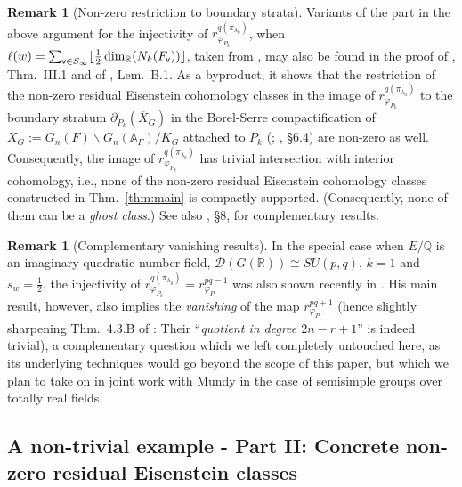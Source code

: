 \documentclass[a4paper,10pt]{amsart}
\theoremstyle{definition}
\newtheorem{rem}[equation]{Remark}
\numberwithin{equation}{section}
\def\R{\mathbb R}
\def\A{\mathbb A}
\def\Q{\mathbb Q}
\def\vv{{\sf v}} %
\begin{document}
\begin{rem}[Non-zero restriction to boundary strata]
Variants of the part in the above argument for the injectivity of $r^{q(\pi_{\lambda_0})}_{\varphi_{P_k}}$, when $\ell(w)=\sum_{\vv\in S_\infty}\lfloor\tfrac12 \dim_{\R}(N_{k}(F_\vv))\rfloor $, taken from \cite{grob22}, may also be found in the proof of \cite{rosp}, Thm.\ III.1 and of \cite{nairrai}, Lem.\ B.1. As a byproduct, it shows that the restriction of the non-zero residual Eisenstein cohomology classes in the image of $r^{q(\pi_{\lambda_0})}_{\varphi_{P_k}}$ to the boundary stratum $\partial_{P_k}(\overline X_G)$ in the Borel-Serre compactification of $X_G:=G_n(F)\backslash G_n(\A_F)/K_G$ attached to $P_k$ (\cite{boserre}; \cite{rohlfs}, \S 6.4) are non-zero as well. Consequently, the image of $r^{q(\pi_{\lambda_0})}_{\varphi_{P_k}}$ has trivial intersection with interior cohomology, i.e., none of the non-zero residual Eisenstein cohomology classes constructed in Thm.\ \ref{thm:main} is compactly supported. (Consequently, none of them can be a {\it ghost class}.) See also \cite{grobner-EisRes}, \S8, for complementary results.
\end{rem}

\begin{rem}[Complementary vanishing results]
In the special case when $E/\Q$ is an imaginary quadratic number field, $\mathcal D(G(\R))\cong SU(p,q)$, $k=1$ and $s_w=\tfrac12$, the injectivity of $r^{q(\pi_{\lambda_0})}_{\varphi_{P_k}}=r^{pq-1}_{\varphi_{P_1}}$ was also shown recently in \cite{mundy}. His main result, however, also implies the {\it vanishing} of the map $r^{pq+1}_{\varphi_{P_1}}$ (hence slightly sharpening Thm.\ 4.3.B of \cite{grabschwun}: Their ``{\it quotient in degree $2n-r+1$}'' is indeed trivial), a complementary question which we left completely untouched here, as its underlying techniques would go beyond the scope of this paper, but which we plan to take on in joint work with Mundy in the case of semisimple groups over totally real fields. 
\end{rem}

\subsection{A non-trivial example - Part II: Concrete non-zero residual Eisenstein classes}
\end{document}
